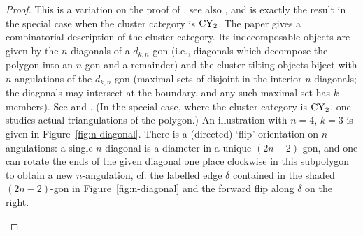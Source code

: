 \documentclass[pdftex]{sigma}
\theoremstyle{definition}
\numberwithin{equation}{section}
\begin{document}
 \begin{proof}
 This is a variation on the proof of \cite[Theorem 9.9]{BS}, see also \cite[Theorem~7.15]{Ikeda}, and is exactly the result \cite[Theorem~4.7]{Brustle-YuQiu} in the special case when the cluster category is ${\rm CY}_2$. The paper \cite{Baur-Marsh} gives a combinatorial description of the cluster category. Its indecomposable objects are given by the $n$-diagonals of a $d_{k,n}$-gon (i.e., diagonals which decompose the polygon into an $n$-gon and a remainder) and the cluster tilting objects biject with $n$-angulations of the $d_{k,n}$-gon (maximal sets of disjoint-in-the-interior $n$-diagonals; the diagonals may intersect at the boundary, and any such maximal set has $k$ members). See \cite[Proposition~5.4]{Baur-Marsh} and \cite[Theorem~4.2]{Jacquet-Malo}. (In the special case, where the cluster category is ${\rm CY}_2$, one studies actual triangulations of the polygon.) An illustration with $n=4$, $k=3$ is given in Figure~\ref{fig:n-diagonal}. There is a (directed) `flip' orientation on $n$-angulations: a single $n$-diagonal is a diameter in a unique $(2n-2)$-gon, and one can rotate the ends of the given diagonal one place clockwise in this subpolygon to obtain a new $n$-angulation, cf. the labelled edge $\delta$ contained in the shaded $(2n-2)$-gon in Figure~\ref{fig:n-diagonal} and the forward flip along $\delta$ on the right.

\begin{figure}[ht]\centering

\end{figure}
\end{proof}
\end{document}
